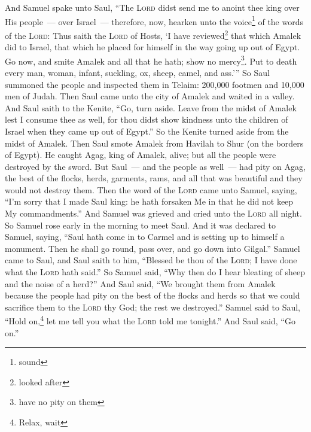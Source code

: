 
\begin{enumerate*}[mode=unboxed]
     And Samuel spake unto Saul, ``The \textsc{Lord} didst send me to anoint thee king over His people~--- over Israel~--- therefore, now, hearken unto the voice\footnote{sound} of the words of the \textsc{Lord}:%
     Thus saith the \textsc{Lord} of Hosts, `I have reviewed\footnote{looked after} that which Amalek did to Israel, that which he placed for himself in the way going up out of Egypt.%
     Go now, and smite Amalek and all that he hath; show no mercy\footnote{have no pity on them}. Put to death every man, woman, infant, suckling, ox, sheep, camel, and ass.'''%
     So Saul summoned the people and inspected them in Telaim: 200,000 footmen and 10,000 men of Judah.%
     Then Saul came unto the city of Amalek and waited in a valley.%
     And Saul saith to the Kenite, ``Go, turn aside. Leave from the midst of Amalek lest I consume thee as well, for thou didst show kindness unto the children of Israel when they came up out of Egypt.'' So the Kenite turned aside from the midst of Amalek.%
     Then Saul smote Amalek from Havilah to Shur (on the borders of Egypt).%
     He caught Agag, king of Amalek, alive; but all the people were destroyed by the sword.%
     But Saul~--- and the people as well~--- had pity on Agag, the best of the flocks, herds, garments, rams, and all that was beautiful and they would not destroy them.%
     Then the word of the \textsc{Lord} came unto Samuel, saying,%
     ``I'm sorry that I made Saul king: he hath forsaken Me in that he did not keep My commandments.'' And Samuel was grieved and cried unto the \textsc{Lord} all night.%
     So Samuel rose early in the morning to meet Saul. And it was declared to Samuel, saying, ``Saul hath come in to Carmel and is setting up to himself a monument. Then he shall go round, pass over, and go down into Gilgal.''%
     Samuel came to Saul, and Saul saith to him, ``Blessed be thou of the \textsc{Lord}; I have done what the \textsc{Lord} hath said.''%
     So Samuel said, ``Why then do I hear bleating of sheep and the noise of a herd?''%
     And Saul said, ``We brought them from Amalek because the people had pity on the best of the flocks and herds so that we could sacrifice them to the \textsc{Lord} thy God; the rest we destroyed.''%
     Samuel said to Saul, ``Hold on,\footnote{Relax, wait} let me tell you what the \textsc{Lord} told me tonight.'' And Saul said, ``Go on.''%

\end{enumerate*}
